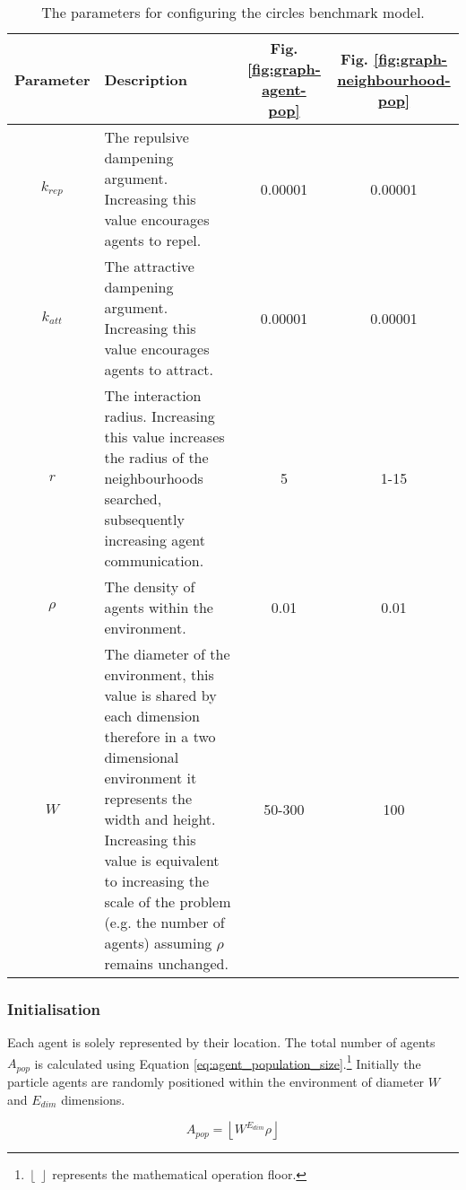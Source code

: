     \begin{table}
      \begin{tabu}{ |c|>{\raggedright}X|c|c| }
        \hline
        \textbf{Parameter} & \textbf{Description} & Fig. \ref{fig:graph-agent-pop} & Fig. \ref{fig:graph-neighbourhood-pop} \\ \hline
        $k_{rep}$ & The repulsive dampening argument. Increasing this value encourages agents to repel. & 0.00001 & 0.00001 \\ \hline
        $k_{att}$ & The attractive dampening argument. Increasing this value encourages agents to attract. & 0.00001 & 0.00001 \\ \hline
        $r$ & The interaction radius. Increasing this value increases the radius of the neighbourhoods searched, subsequently increasing agent communication. & 5 & 1-15 \\ \hline
        $ \rho $ & The density of agents within the environment. & 0.01 & 0.01 \\ \hline
        $W$ & The diameter of the environment, this value is shared by each dimension therefore in a two dimensional environment it represents the width and height. Increasing this value is equivalent to increasing the scale of the problem (e.g. the number of agents) assuming $ \rho $ remains unchanged. & 50-300 & 100\\ \hline
      \end{tabu}
      \caption{\label{tab:benchmark-parameters}The parameters for configuring the circles benchmark model.}
    \vspace{-1cm}
    \end{table}    
    
    \subsubsection{Initialisation}
      Each agent is solely represented by their location. The total number of agents $A_{pop}$ is calculated using Equation \ref{eq:agent_population_size}.\footnote{$\left\lfloor\:\right\rfloor$ represents the mathematical operation floor.} Initially the particle agents are randomly positioned within the environment of diameter $W$ and $E_{dim}$ dimensions.      
      
      \begin{equation}\label{eq:agent_population_size}
        A_{pop} = \left\lfloor{W^{E_{dim}} \rho}\right\rfloor
      \end{equation}
    
